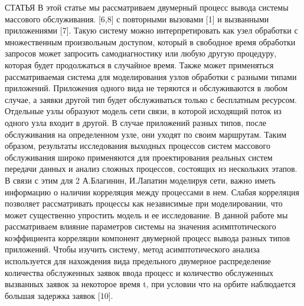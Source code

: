 СТАТЬЯ
В этой статье мы рассматриваем двумерный процесс вывода системы массового обслуживания.
[6,8] с повторными вызовами [1] и вызванными приложениями [7]. Такую систему можно интерпретировать
как узел обработки с множественным произвольным доступом, который в свободное время
обработки запросов может запросить самодиагностику или любую другую процедуру, которая
будет продолжаться в случайное время. Также может применяться рассматриваемая система
для моделирования узлов обработки с разными типами приложений. Приложения
одного вида не теряются и обслуживаются в любом случае, а заявки
другой тип будет обслуживаться только с бесплатным ресурсом.
Отдельные узлы образуют модель сети связи, в которой
исходящий поток из одного узла входит в другой. В случае приложений
разных типов, после обслуживания на определенном узле, они уходят по своим маршрутам.
Таким образом, результаты исследования выходных процессов систем массового обслуживания
широко применяются для проектирования реальных систем передачи данных и
анализ сложных процессов, состоящих из нескольких этапов. В связи с этим для
2 А.Благинин, И.Лапатин
моделируя сети, важно иметь информацию о наличии
корреляция между процессами в нем. Слабая корреляция позволяет
рассматривать процессы как независимые при моделировании, что может существенно
упростить модель и ее исследование.
В данной работе мы рассматриваем влияние параметров системы на
значения асимптотического коэффициента корреляции компонент двумерной
процесс вывода разных типов приложений. Чтобы изучить систему,
метод асимптотического анализа используется для нахождения вида предельного
двумерное распределение количества обслуженных заявок ввода
процесс и количество обслуженных вызванных заявок за некоторое время t, при условии
что на орбите наблюдается большая задержка заявок [10].

